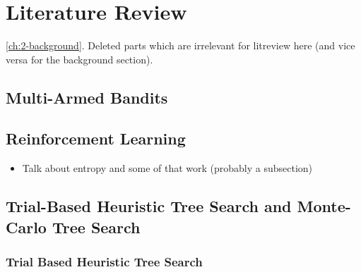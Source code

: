 

\chapter{\label{ch:3-litreview}Literature Review}

    \minitoc

     \ref{ch:2-background}. Deleted parts which are irrelevant for litreview here (and vice versa for the background section).


\section{Multi-Armed Bandits}
\label{sec:3-0-mab}


\section{Reinforcement Learning}
\label{sec:3-1-rl}

    \begin{itemize}
        \item Talk about entropy and some of that work (probably a subsection)
    \end{itemize}

\section{Trial-Based Heuristic Tree Search and Monte-Carlo Tree Search}
\label{sec:3-2-thts}

    \subsection{Trial Based Heuristic Tree Search}
    \label{sec:3-2-1-thts}

